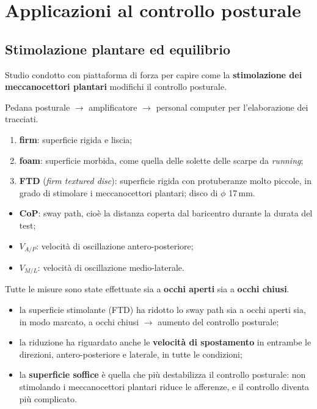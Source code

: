 \section{Applicazioni al controllo posturale}

\subsection{Stimolazione plantare ed equilibrio}

Studio condotto con piattaforma di forza per capire come la \textbf{stimolazione dei meccanocettori
plantari} modifichi il controllo posturale.

Pedana posturale $\rightarrow$ amplificatore $\rightarrow$ personal computer per l'elaborazione dei
tracciati.

\begin{enumerate}
  \item \textbf{firm}: superficie rigida e liscia;
  \item \textbf{foam}: superficie morbida, come quella delle solette delle scarpe da
    \textit{running};
  \item \textbf{FTD} (\textit{firm textured disc}): superficie rigida con protuberanze molto
    piccole,
    in grado di stimolare i meccanocettori plantari; disco di $\phi$ 17\,mm.
\end{enumerate}

\begin{itemize}
  \item \textbf{CoP}: sway path, cioè la distanza coperta dal baricentro durante la durata del test;
  \item \textbf{$V_{A/P}$}: velocità di oscillazione antero-posteriore;
  \item \textbf{$V_{M/L}$}: velocità di oscillazione medio-laterale.
\end{itemize}
Tutte le misure sono state effettuate sia a \textbf{occhi aperti} sia a \textbf{occhi chiusi}.

\begin{itemize}
  \item la superficie stimolante (FTD) ha ridotto lo sway path sia a occhi aperti sia, in modo
    marcato, a occhi chiusi $\rightarrow$ aumento del controllo posturale;
  \item la riduzione ha riguardato anche le \textbf{velocità di spostamento} in entrambe le
    direzioni, antero-posteriore e laterale, in tutte le condizioni;
  \item la \textbf{superficie soffice} è quella che più destabilizza il controllo posturale: non
    stimolando i meccanocettori plantari riduce le afferenze, e il controllo diventa più complicato.
\end{itemize}

